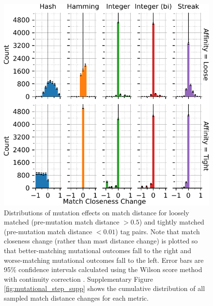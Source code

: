 \begin{figure}
\begin{center}

\includegraphics[width=\columnwidth]{img/mutational_step/bitweight=0dot5+seed=1+title=low-mutational-step+viz=hist+_data_hathash_hash=95a57768de56995a+_script_fullcat_hash=aa068ad24b386169+ext=}
\caption{
Distributions of mutation effects on match distance for loosely matched (pre-mutation match distance $> 0.5$) and tightly matched (pre-mutation match distance $< 0.01$) tag pairs.
Note that match closeness change (rather than mast distance change) is plotted so that better-matching mutational outcomes fall to the right and worse-matching mutational outcomes fall to the left.
Error bars are 95\% confidence intervals calculated using the Wilson score method with continuity correction \citep{newcombe1998two}.
Supplementary Figure \ref{fig:mutational_step_supp} shows the cumulative distribution of all sampled match distance changes for each metric.
}
\label{fig:mutational_step}

\end{center}
\end{figure}

